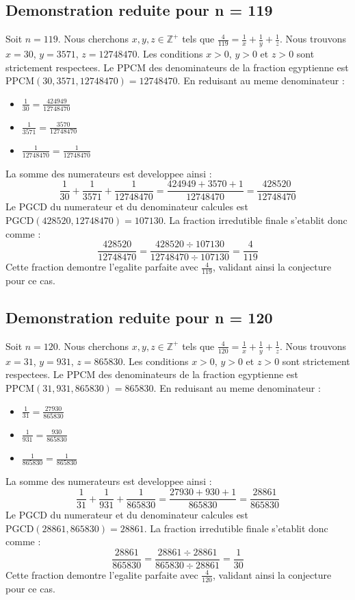 \documentclass[11pt,a4paper]{article}
\begin{document}
\subsection{Demonstration reduite pour n = 119}
Soit $n = 119$. Nous cherchons $x, y, z \in \mathbb{Z}^{+}$ tels que $\frac{4}{119} = \frac{1}{x} + \frac{1}{y} + \frac{1}{z}$.
Nous trouvons $x = 30$, $y = 3571$, $z = 12748470$.
Les conditions $x > 0$, $y > 0$ et $z > 0$ sont strictement respectees.
Le PPCM des denominateurs de la fraction egyptienne est $\text{PPCM}(30, 3571, 12748470) = 12748470$.
En reduisant au meme denominateur :
\begin{itemize}
    \item $\frac{1}{30} = \frac{424949}{12748470}$
    \item $\frac{1}{3571} = \frac{3570}{12748470}$
    \item $\frac{1}{12748470} = \frac{1}{12748470}$
\end{itemize}
La somme des numerateurs est developpee ainsi :
$$ \frac{1}{30} + \frac{1}{3571} + \frac{1}{12748470} = \frac{424949 + 3570 + 1}{12748470} = \frac{428520}{12748470} $$
Le PGCD du numerateur et du denominateur calcules est $\text{PGCD}(428520, 12748470) = 107130$.
La fraction irredutible finale s'etablit donc comme :
$$ \frac{428520}{12748470} = \frac{428520 \div 107130}{12748470 \div 107130} = \frac{4}{119} $$
Cette fraction demontre l'egalite parfaite avec $\frac{4}{119}$, validant ainsi la conjecture pour ce cas.

\subsection{Demonstration reduite pour n = 120}
Soit $n = 120$. Nous cherchons $x, y, z \in \mathbb{Z}^{+}$ tels que $\frac{4}{120} = \frac{1}{x} + \frac{1}{y} + \frac{1}{z}$.
Nous trouvons $x = 31$, $y = 931$, $z = 865830$.
Les conditions $x > 0$, $y > 0$ et $z > 0$ sont strictement respectees.
Le PPCM des denominateurs de la fraction egyptienne est $\text{PPCM}(31, 931, 865830) = 865830$.
En reduisant au meme denominateur :
\begin{itemize}
    \item $\frac{1}{31} = \frac{27930}{865830}$
    \item $\frac{1}{931} = \frac{930}{865830}$
    \item $\frac{1}{865830} = \frac{1}{865830}$
\end{itemize}
La somme des numerateurs est developpee ainsi :
$$ \frac{1}{31} + \frac{1}{931} + \frac{1}{865830} = \frac{27930 + 930 + 1}{865830} = \frac{28861}{865830} $$
Le PGCD du numerateur et du denominateur calcules est $\text{PGCD}(28861, 865830) = 28861$.
La fraction irredutible finale s'etablit donc comme :
$$ \frac{28861}{865830} = \frac{28861 \div 28861}{865830 \div 28861} = \frac{1}{30} $$
Cette fraction demontre l'egalite parfaite avec $\frac{4}{120}$, validant ainsi la conjecture pour ce cas.
\end{document}
